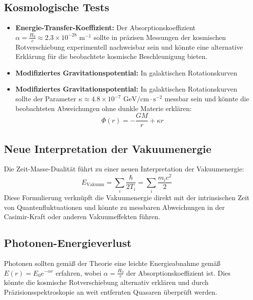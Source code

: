 \documentclass[a4paper,12pt]{article}
\begin{document}
	\subsection{Kosmologische Tests}
	
	\begin{itemize}
		\item \textbf{Energie-Transfer-Koeffizient:} Der Absorptionskoeffizient $\alpha = \frac{H_0}{c} \approx 2.3 \times 10^{-28} \text{ m}^{-1}$ sollte in präzisen Messungen der kosmischen Rotverschiebung experimentell nachweisbar sein und könnte eine alternative Erklärung für die beobachtete kosmische Beschleunigung bieten.
		
		\item \textbf{Modifiziertes Gravitationspotential:} In galaktischen Rotationskurven
		
		
		\item \textbf{Modifiziertes Gravitationspotential:} In galaktischen Rotationskurven sollte der Parameter $\kappa \approx 4.8 \times 10^{-7} \text{ GeV/cm}\cdot\text{s}^{-2}$ messbar sein und könnte die beobachteten Abweichungen ohne dunkle Materie erklären:
		\begin{equation}
			\Phi(r) = -\frac{GM}{r} + \kappa r
		\end{equation}
		\end{itemize}
		
		\subsection{Neue Interpretation der Vakuumenergie}
		
		Die Zeit-Masse-Dualität führt zu einer neuen Interpretation der Vakuumenergie:
		\begin{equation}
		E_{\text{Vakuum}} = \sum_i \frac{\hbar}{2T_i} = \sum_i \frac{m_i c^2}{2}
		\end{equation}
		Diese Formulierung verknüpft die Vakuumenergie direkt mit der intrinsischen Zeit von Quantenfluktuationen und könnte zu messbaren Abweichungen in der Casimir-Kraft oder anderen Vakuumeffekten führen.
		
		\subsection{Photonen-Energieverlust}
		
		Photonen sollten gemäß der Theorie eine leichte Energieabnahme gemäß $E(r) = E_0 e^{-\alpha r}$ erfahren, wobei $\alpha = \frac{H_0}{c}$ der Absorptionskoeffizient ist. Dies könnte die kosmische Rotverschiebung alternativ erklären und durch Präzisionsspektroskopie an weit entfernten Quasaren überprüft werden.
		
\end{document}

